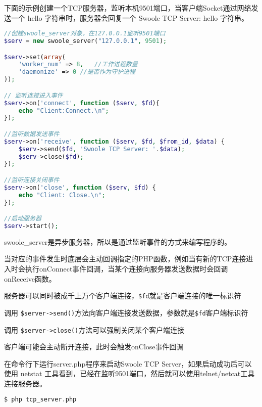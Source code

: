 下面的示例创建一个TCP服务器，监听本机9501端口，当客户端Socket通过网络发送一个 hello 字符串时，服务器会回复一个 Swoole TCP Server: hello 字符串。


\begin{lstlisting}[language=PHP]
//创建swoole_server对象，在127.0.0.1监听9501端口
$serv = new swoole_server("127.0.0.1", 9501);

$serv->set(array(
    'worker_num' => 8,   //工作进程数量
    'daemonize' => 0 //是否作为守护进程
));

// 监听连接进入事件
$serv->on('connect', function ($serv, $fd){
    echo "Client:Connect.\n";
});

//监听数据发送事件
$serv->on('receive', function ($serv, $fd, $from_id, $data) {
    $serv->send($fd, 'Swoole TCP Server: '.$data);
    $serv->close($fd);
});

//监听连接关闭事件
$serv->on('close', function ($serv, $fd) {
    echo "Client: Close.\n";
});

//启动服务器
$serv->start();
\end{lstlisting}

swoole\_server是异步服务器，所以是通过监听事件的方式来编写程序的。

当对应的事件发生时底层会主动回调指定的PHP函数，例如当有新的TCP连接进入时会执行onConnect事件回调，当某个连接向服务器发送数据时会回调onReceive函数。

\begin{compactitem}
\item 服务器可以同时被成千上万个客户端连接，\texttt{\$fd}就是客户端连接的唯一标识符
\item 调用 \texttt{\$server->send()}方法向客户端连接发送数据，参数就是\texttt{\$fd}客户端标识符
\item 调用 \texttt{\$server->close()}方法可以强制关闭某个客户端连接
\item 客户端可能会主动断开连接，此时会触发onClose事件回调
\end{compactitem}

在命令行下运行server.php程序来启动Swoole TCP Server，如果启动成功后可以使用 netstat 工具看到，已经在监听9501端口，然后就可以使用telnet/netcat工具连接服务器。

\begin{lstlisting}[language=PHP]
$ php tcp_server.php 
\end{lstlisting}


